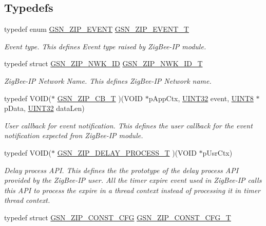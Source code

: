 \subsection*{Typedefs}
\begin{DoxyCompactItemize}
\item 
typedef enum \hyperlink{a00618_a6118b093f8c8dfb5596d2971c5c2c698}{GSN\_\-ZIP\_\-EVENT} \hyperlink{a00618_ac587cf0eef9961ea24592b3352992346}{GSN\_\-ZIP\_\-EVENT\_\-T}
\begin{DoxyCompactList}\small\item\em Event type. This defines Event type raised by ZigBee-\/IP module. \end{DoxyCompactList}\item 
typedef struct \hyperlink{a00441}{GSN\_\-ZIP\_\-NWK\_\-ID} \hyperlink{a00618_ab9aa63483741b5262a1f9a8381d1117b}{GSN\_\-ZIP\_\-NWK\_\-ID\_\-T}
\begin{DoxyCompactList}\small\item\em ZigBee-\/IP Network Name. This defines ZigBee-\/IP Network name. \end{DoxyCompactList}\item 
typedef VOID($\ast$ \hyperlink{a00618_a537c0cfba52f252417cd654bd4cece58}{GSN\_\-ZIP\_\-CB\_\-T} )(VOID $\ast$pAppCtx, \hyperlink{a00660_gae1e6edbbc26d6fbc71a90190d0266018}{UINT32} event, \hyperlink{a00660_gab27e9918b538ce9d8ca692479b375b6a}{UINT8} $\ast$pData, \hyperlink{a00660_gae1e6edbbc26d6fbc71a90190d0266018}{UINT32} dataLen)
\begin{DoxyCompactList}\small\item\em User callback for event notification. This defines the user callback for the event notification expected fron ZigBee-\/IP module. \end{DoxyCompactList}\item 
typedef VOID($\ast$ \hyperlink{a00618_a7f63a0d767866fd213452687d2666c67}{GSN\_\-ZIP\_\-DELAY\_\-PROCESS\_\-T} )(VOID $\ast$pUsrCtx)
\begin{DoxyCompactList}\small\item\em Delay process API. This defines the the prototype of the delay process API provided by the ZigBee-\/IP user. All the timer expire event used in ZigBee-\/IP calls this API to process the expire in a thread context instead of processing it in timer thread context. \end{DoxyCompactList}\item 
typedef struct \hyperlink{a00439}{GSN\_\-ZIP\_\-CONST\_\-CFG} \hyperlink{a00618_adb1586a8cb312762accc1ffe2fb65c0e}{GSN\_\-ZIP\_\-CONST\_\-CFG\_\-T}

\end{DoxyCompactItemize}
